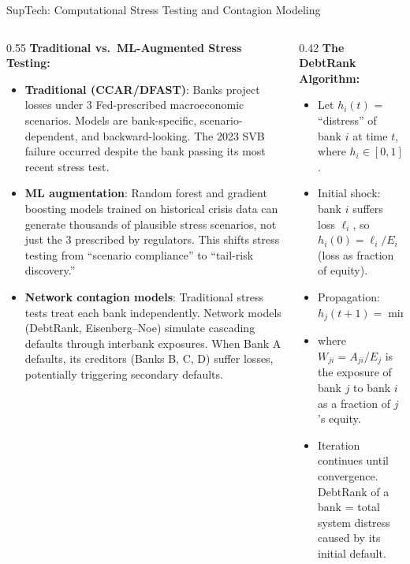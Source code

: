 
\begin{frame}{SupTech: Computational Stress Testing and Contagion Modeling}
  \begin{columns}[T]
    \begin{column}{0.55\textwidth}
      \textbf{Traditional vs.\ ML-Augmented Stress Testing:}
      \begin{itemize}
        \item \textbf{Traditional (CCAR/DFAST)}: Banks project losses under 3 Fed-prescribed macroeconomic scenarios. Models are bank-specific, scenario-dependent, and backward-looking. The 2023 SVB failure occurred despite the bank passing its most recent stress test.
        \item \textbf{ML augmentation}: Random forest and gradient boosting models trained on historical crisis data can generate thousands of plausible stress scenarios, not just the 3 prescribed by regulators. This shifts stress testing from ``scenario compliance'' to ``tail-risk discovery.''
        \item \textbf{Network contagion models}: Traditional stress tests treat each bank independently. Network models (DebtRank, Eisenberg--Noe) simulate cascading defaults through interbank exposures. When Bank A defaults, its creditors (Banks B, C, D) suffer losses, potentially triggering secondary defaults.
      \end{itemize}
    \end{column}
    \begin{column}{0.42\textwidth}
      \textbf{The DebtRank Algorithm:}
      \begin{itemize}
        \item Let $h_i(t)$ = ``distress'' of bank $i$ at time $t$, where $h_i \in [0, 1]$.
        \item Initial shock: bank $i$ suffers loss $\ell_i$, so $h_i(0) = \ell_i / E_i$ (loss as fraction of equity).
        \item Propagation: $h_j(t+1) = \min\{1, \, h_j(t) + \sum_{i} W_{ji} \cdot h_i(t)\}$
        \item where $W_{ji} = A_{ji} / E_j$ is the exposure of bank $j$ to bank $i$ as a fraction of $j$'s equity.
        \item Iteration continues until convergence. DebtRank of a bank = total system distress caused by its initial default.
      \end{itemize}
      \vspace{0.2em}

\end{column}
\end{columns}
\end{frame}
